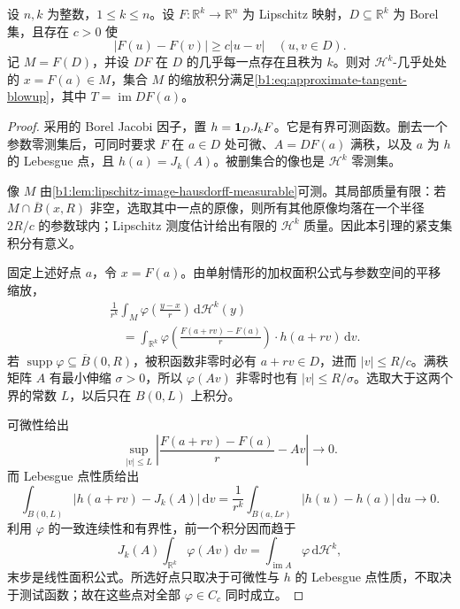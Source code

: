\begin{lemma}\label{b1:lem:bilipschitz-piece-blowup}
设 \(n,k\) 为整数，\(1\leq k\leq n\)。设 \(F:\mathbb R^k\rightarrow\mathbb R^n\) 为 Lipschitz 映射，\(D\subseteq\mathbb R^k\) 为 Borel 集，且存在 \(c>0\) 使
\[
 |F(u)-F(v)|\geq c|u-v|\quad(u,v\in D).
\]
记 \(M=F(D)\)，并设 \(DF\) 在 \(D\) 的几乎每一点存在且秩为 \(k\)。则对 \(\mathcal H^k\)-几乎处处的 \(x=F(a)\in M\)，集合 \(M\) 的缩放积分满足\eqref{b1:eq:approximate-tangent-blowup}，其中 \(T=\operatorname{im}DF(a)\)。
\end{lemma}
\begin{proof}
采用的 Borel Jacobi 因子，置 \(h={\bf1}_D J_kF\)。它是有界可测函数。删去一个参数零测集后，可同时要求 \(F\) 在 \(a\in D\) 处可微、\(A=DF(a)\) 满秩，以及 \(a\) 为 \(h\) 的 Lebesgue 点，且 \(h(a)=J_k(A)\)。被删集合的像也是 \(\mathcal H^k\) 零测集。

像 \(M\) 由\cref{b1:lem:lipschitz-image-hausdorff-measurable}可测。其局部质量有限：若 \(M\cap\overline B(x,R)\) 非空，选取其中一点的原像，则所有其他原像均落在一个半径 \(2R/c\) 的参数球内；Lipschitz 测度估计给出有限的 \(\mathcal H^k\) 质量。因此本引理的紧支集积分有意义。

固定上述好点 \(a\)，令 \(x=F(a)\)。由单射情形的加权面积公式与参数空间的平移缩放，
\[
 \begin{aligned}
 &\frac1{r^k}\int_M
       \varphi\left(\frac{y-x}{r}\right)\,\mathrm d\mathcal H^k(y)\\
 &\hspace{1em}=
 \int_{\mathbb R^k}
   \varphi\left(\frac{F(a+rv)-F(a)}r\right)\cdot h(a+rv)\,\mathrm dv.
 \end{aligned}
\]
若 \(\operatorname{supp}\varphi\subseteq\overline B(0,R)\)，被积函数非零时必有 \(a+rv\in D\)，进而 \(|v|\leq R/c\)。满秩矩阵 \(A\) 有最小伸缩 \(\sigma>0\)，所以 \(\varphi(Av)\) 非零时也有 \(|v|\leq R/\sigma\)。选取大于这两个界的常数 \(L\)，以后只在 \(B(0,L)\) 上积分。

可微性给出
\[
 \sup_{|v|\leq L}
 \left|\frac{F(a+rv)-F(a)}r-Av\right|\longrightarrow0.
\]
而 Lebesgue 点性质给出
\[
 \int_{B(0,L)}|h(a+rv)-J_k(A)|\,\mathrm dv
 =\frac1{r^k}\int_{B(a,Lr)}|h(u)-h(a)|\,\mathrm du
 \longrightarrow0.
\]
利用 \(\varphi\) 的一致连续性和有界性，前一个积分因而趋于
\[
 J_k(A)\int_{\mathbb R^k}\varphi(Av)\,\mathrm dv
 =\int_{\operatorname{im}A}\varphi\,\mathrm d\mathcal H^k,
\]
末步是线性面积公式。所选好点只取决于可微性与 \(h\) 的 Lebesgue 点性质，不取决于测试函数；故在这些点对全部 \(\varphi\in C_c\) 同时成立。
\end{proof}

